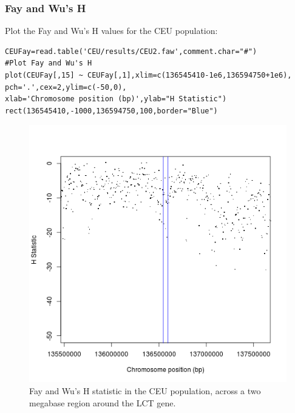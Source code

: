 \documentclass[a4paper,10pt]{article}
\begin{document}
\subsubsection{Fay and Wu's H}
Plot the Fay and Wu's H values for the CEU population:\\
\begin{verbatim}
CEUFay=read.table('CEU/results/CEU2.faw',comment.char="#")
#Plot Fay and Wu's H
plot(CEUFay[,15] ~ CEUFay[,1],xlim=c(136545410-1e6,136594750+1e6),
pch='.',cex=2,ylim=c(-50,0),
xlab='Chromosome position (bp)',ylab="H Statistic")
rect(136545410,-1000,136594750,100,border="Blue") 
\end{verbatim}
\begin{figure}
\centering
\includegraphics{pictures/CEUFay.png}
\caption{Fay and Wu's H statistic in the CEU population, across a two
  megabase region around the LCT gene.}
\label{fig:fayceu}
\end{figure}
\end{document}
